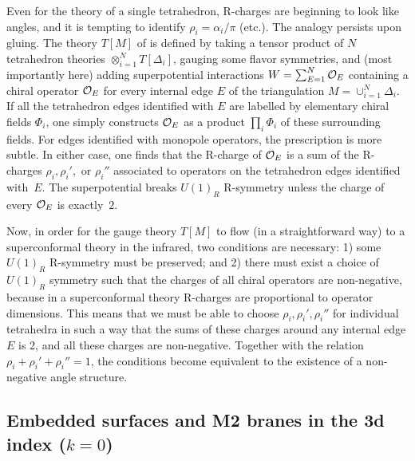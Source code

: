 \documentclass[12pt]{article}
\begin{document}
Even for the theory of a single tetrahedron, R-charges are beginning to look like angles, and it is tempting to identify $\rho_i=\alpha_i/\pi$ (etc.). The analogy persists upon gluing. The theory $T[M]$ of \cite{DIDGG} is defined by taking a tensor product of $N$ tetrahedron theories $\otimes_{i=1}^N T[\Delta_i]$, gauging some flavor symmetries, and (most importantly here) adding superpotential interactions $W = \sum_{E=1}^N \mathcal{O}_E$ containing a chiral operator $\mathcal{O}_E$ for every internal edge $E$ of the triangulation $M=\cup_{i=1}^N \Delta_i$. If all the tetrahedron edges identified with $E$ are labelled by elementary chiral fields $\Phi_i$, one simply constructs $\mathcal{O}_E$ as a product $\prod_i\Phi_i$ of these surrounding fields. For edges identified with monopole operators, the prescription is more subtle. In either case, one finds that the R-charge of $\mathcal{O}_E$ is a sum of the R-charges $\rho_i,\rho_i',$ or $\rho_i''$ associated to operators on the tetrahedron edges identified with~$E$. The superpotential breaks $U(1)_R$ R-symmetry unless the charge of every $\mathcal{O}_E$ is exactly~$2$.


Now, in order for the gauge theory $T[M]$ to flow (in a straightforward way) to a superconformal theory in the infrared, two conditions are necessary: 1) some $U(1)_R$ R-symmetry must be preserved; and 2) there must exist a choice of $U(1)_R$ symmetry such that the charges of all chiral operators are non-negative, because in a superconformal theory R-charges are proportional to operator dimensions. This means that we must be able to choose $\rho_i,\rho_i',\rho_i''$ for individual tetrahedra in such a way that the sums of these charges around any internal edge $E$ is 2, and all these charges are non-negative. Together with the relation $\rho_i+\rho_i'+\rho_i''=1$, the conditions become equivalent to the existence of a non-negative angle structure. 


\subsection{Embedded surfaces and M2 branes in the 3d index ($k=0$)}
\label{DI.sec:M2}
\end{document}
